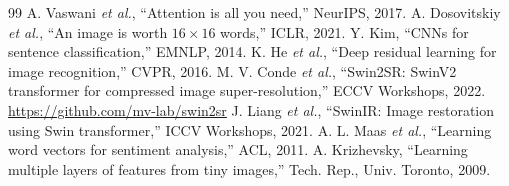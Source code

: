 \documentclass[10pt,conference,a4paper]{article}
\begin{document}
\begin{thebibliography}{99}\footnotesize
   A. Vaswani \emph{et al.}, ``Attention is all you need,'' NeurIPS, 2017.
   A. Dosovitskiy \emph{et al.}, ``An image is worth $16{\times}16$ words,'' ICLR, 2021.
   Y. Kim, ``CNNs for sentence classification,'' EMNLP, 2014.
   K. He \emph{et al.}, ``Deep residual learning for image recognition,'' CVPR, 2016.
   M. V. Conde \emph{et al.}, ``Swin2SR: SwinV2 transformer for compressed image super-resolution,'' ECCV Workshops, 2022. \url{https://github.com/mv-lab/swin2sr}
   J. Liang \emph{et al.}, ``SwinIR: Image restoration using Swin transformer,'' ICCV Workshops, 2021.
   A. L. Maas \emph{et al.}, ``Learning word vectors for sentiment analysis,'' ACL, 2011.
   A. Krizhevsky, ``Learning multiple layers of features from tiny images,'' Tech. Rep., Univ. Toronto, 2009.
\end{thebibliography}
\end{document}
